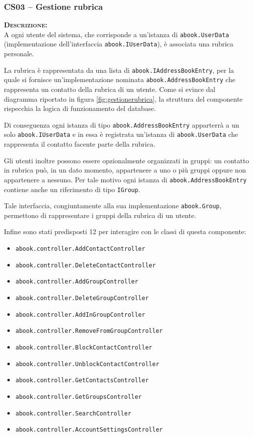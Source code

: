 \subsubsection{CS03 -- Gestione rubrica}\label{sec:cs03}
\begin{description}
	\item{\scshape\bfseries Descrizione:}\\
A ogni utente del sistema, che corrisponde a un'istanza di \texttt{abook.UserData} (implementazione dell'interfaccia \texttt{abook.IUserData}), è associata una rubrica personale. 

La rubrica è rappresentata da una lista di \texttt{abook.IAddressBookEntry}, per la quale si fornisce un'implementazione nominata \texttt{abook.AddressBookEntry} che rappresenta un contatto della rubrica di un utente. Come si evince dal diagramma riportato in figura \ref{fig:gestionerubrica}, la struttura del componente rispecchia la logica di funzionamento del database.

Di conseguenza ogni istanza di tipo \texttt{abook.AddressBookEntry} apparterrà a un solo \texttt{abook.IUserData} e in essa è registrata un'istanza di \texttt{abook.UserData} che rappresenta il contatto facente parte della rubrica.

Gli utenti inoltre possono essere opzionalmente organizzati in gruppi: un contatto in rubrica può, in un dato momento, appartenere a uno o più gruppi oppure non appartenere a nessuno. Per tale motivo ogni istanza di \texttt{abook.AddressBookEntry} contiene anche un riferimento di tipo \texttt{IGroup}.

Tale interfaccia, congiuntamente alla sua implementazione \texttt{abook.Group}, permettono di rappresentare i gruppi della rubrica di un utente.

Infine sono stati predisposti 12  per interagire con le classi di questa componente:

\begin{itemize}
	  \item \texttt{abook.controller.AddContactController}
	  \item \texttt{abook.controller.DeleteContactController}
	  \item \texttt{abook.controller.AddGroupController}
	  \item \texttt{abook.controller.DeleteGroupController}
	  \item \texttt{abook.controller.AddInGroupController}
	  \item \texttt{abook.controller.RemoveFromGroupController}
	  \item \texttt{abook.controller.BlockContactController}
	  \item \texttt{abook.controller.UnblockContactController}
	  \item \texttt{abook.controller.GetContactsController}
	  \item \texttt{abook.controller.GetGroupsController}
	  \item \texttt{abook.controller.SearchController}
	  \item \texttt{abook.controller.AccountSettingsController}
\end{itemize}


\end{description}
